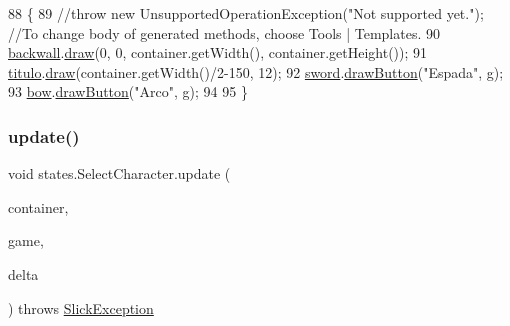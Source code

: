 \begin{DoxyCode}
88                                                                                                        \{
89         \textcolor{comment}{//throw new UnsupportedOperationException("Not supported yet."); //To change body of generated
       methods, choose Tools | Templates.}
90         \mbox{\hyperlink{classstates_1_1_select_character_ad3efe515775d6b2f543ff024b73c0db8}{backwall}}.\mbox{\hyperlink{classorg_1_1newdawn_1_1slick_1_1_image_a9bddcca05c7140ab45df8ac5b250b6cd}{draw}}(0, 0, container.getWidth(), container.getHeight());
91         \mbox{\hyperlink{classstates_1_1_select_character_a08562d62626aed4d70fdd3df76f3bf0e}{titulo}}.\mbox{\hyperlink{classorg_1_1newdawn_1_1slick_1_1_image_a9bddcca05c7140ab45df8ac5b250b6cd}{draw}}(container.getWidth()/2-150, 12);
92         \mbox{\hyperlink{classstates_1_1_select_character_af4275da4746fa27d2db5b23c55e70cf4}{sword}}.\mbox{\hyperlink{classgui_1_1_button_a0963af10c0ebfda675428cf6692e3df5}{drawButton}}(\textcolor{stringliteral}{"Espada"}, g);
93         \mbox{\hyperlink{classstates_1_1_select_character_ade5eda408476aabd909efe788573df89}{bow}}.\mbox{\hyperlink{classgui_1_1_button_a0963af10c0ebfda675428cf6692e3df5}{drawButton}}(\textcolor{stringliteral}{"Arco"}, g);
94         
95     \}
\end{DoxyCode}
\mbox{\label{classstates_1_1_select_character_a195f11a8a0d64fb19d044a1535db7629}} 
\subsubsection{\texorpdfstring{update()}{update()}}
{\footnotesize\ttfamily void states.\+Select\+Character.\+update (\begin{DoxyParamCaption}\item[{\mbox{\hyperlink{classorg_1_1newdawn_1_1slick_1_1_game_container}{Game\+Container}}}]{container,  }\item[{\mbox{\hyperlink{classorg_1_1newdawn_1_1slick_1_1state_1_1_state_based_game}{State\+Based\+Game}}}]{game,  }\item[{int}]{delta }\end{DoxyParamCaption}) throws \mbox{\hyperlink{classorg_1_1newdawn_1_1slick_1_1_slick_exception}{Slick\+Exception}}\hspace{0.3cm}{\ttfamily [inline]}}

